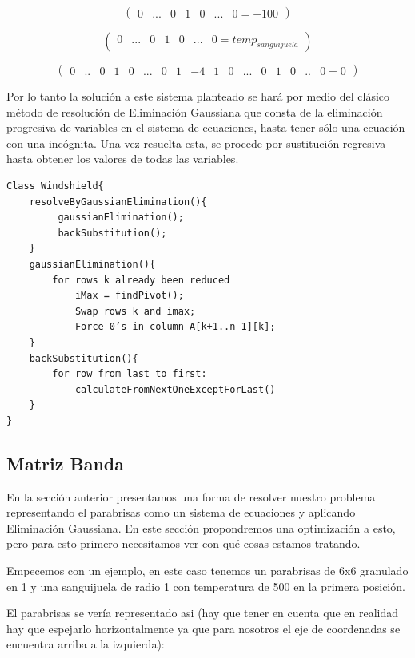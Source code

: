 \[ \left( \begin{array}{ccccccccccc}
0 & ... & 0 & 1 & 0  & ... & 0 = -100 \end{array} 
\right)\] 


\[ \left( \begin{array}{ccccccccccc}
 0 &... & 0 & 1 & 0  & ... & 0 = temp_{sanguijuela} \end{array} 
\right)\] 



\[ \left( \begin{array}{cccccccccccccccccc}
0 & .. & 0 & 1 & 0 & ... & 0 & 1 & -4 & 1 & 0  & ... & 0 & 1 & 0 & .. & 0 = 0 \end{array} 
\right)\] 

 

Por lo tanto la solución a este sistema planteado se hará por medio del clásico método de resolución de Eliminación Gaussiana que consta de la eliminación progresiva de variables en el sistema de ecuaciones, hasta tener sólo una ecuación con una incógnita. Una vez resuelta esta, se procede por sustitución regresiva hasta obtener los valores de todas las variables.

\begin{verbatim}
Class Windshield{
    resolveByGaussianElimination(){
         gaussianElimination();
         backSubstitution();
    } 
    gaussianElimination(){
        for rows k already been reduced
            iMax = findPivot();
            Swap rows k and imax;
            Force 0’s in column A[k+1..n-1][k];
    }
    backSubstitution(){
        for row from last to first:
            calculateFromNextOneExceptForLast()
    }
}
\end{verbatim}

\subsection{Matriz Banda}

En la sección anterior presentamos una forma de resolver nuestro problema representando el parabrisas como un sistema de ecuaciones y aplicando Eliminación Gaussiana. En este sección propondremos una optimización a esto, pero para esto primero necesitamos ver con qué cosas estamos tratando.

Empecemos con un ejemplo, en este caso  tenemos un parabrisas de 6x6 granulado en 1 y una sanguijuela de radio 1 con temperatura de 500 en la primera posición.

El parabrisas se vería representado asi (hay que tener en cuenta que en realidad hay que espejarlo horizontalmente ya que para nosotros el eje de coordenadas se encuentra arriba a la izquierda):

